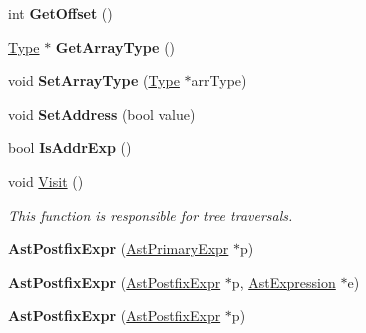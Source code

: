 \begin{DoxyCompactItemize}
\item 
\hypertarget{classAstPostfixExpr_a73527573548a64455b1ff7f7c3e3af83}{int {\bfseries Get\-Offset} ()}\label{classAstPostfixExpr_a73527573548a64455b1ff7f7c3e3af83}

\item 
\hypertarget{classAstPostfixExpr_aa57ee270d53c864251a58b33932e8b93}{\hyperlink{classType}{Type} $\ast$ {\bfseries Get\-Array\-Type} ()}\label{classAstPostfixExpr_aa57ee270d53c864251a58b33932e8b93}

\item 
\hypertarget{classAstPostfixExpr_aa5d70d77be68a21aa2f30a6c276e7453}{void {\bfseries Set\-Array\-Type} (\hyperlink{classType}{Type} $\ast$arr\-Type)}\label{classAstPostfixExpr_aa5d70d77be68a21aa2f30a6c276e7453}

\item 
\hypertarget{classAstPostfixExpr_a8999a89a30f416241a29e7f8b8b0e948}{void {\bfseries Set\-Address} (bool value)}\label{classAstPostfixExpr_a8999a89a30f416241a29e7f8b8b0e948}

\item 
\hypertarget{classAstPostfixExpr_a84889c2ddd3eabd0966e08f85a2576c4}{bool {\bfseries Is\-Addr\-Exp} ()}\label{classAstPostfixExpr_a84889c2ddd3eabd0966e08f85a2576c4}

\item 
void \hyperlink{classAstPostfixExpr_ae3e7fdbd4c2bf888ee62760e6f422cad}{Visit} ()
\begin{DoxyCompactList}\small\item\em This function is responsible for tree traversals. \end{DoxyCompactList}\item 
\hypertarget{classAstPostfixExpr_a8299517f87239b0428545cdfc96f0bbc}{{\bfseries Ast\-Postfix\-Expr} (\hyperlink{classAstPrimaryExpr}{Ast\-Primary\-Expr} $\ast$p)}\label{classAstPostfixExpr_a8299517f87239b0428545cdfc96f0bbc}

\item 
\hypertarget{classAstPostfixExpr_a5dd762cbae8160f94a661ecdf3a90770}{{\bfseries Ast\-Postfix\-Expr} (\hyperlink{classAstPostfixExpr}{Ast\-Postfix\-Expr} $\ast$p, \hyperlink{classAstExpression}{Ast\-Expression} $\ast$e)}\label{classAstPostfixExpr_a5dd762cbae8160f94a661ecdf3a90770}

\item 
\hypertarget{classAstPostfixExpr_af17b325f38a7138728773d86a9342105}{{\bfseries Ast\-Postfix\-Expr} (\hyperlink{classAstPostfixExpr}{Ast\-Postfix\-Expr} $\ast$p)}\label{classAstPostfixExpr_af17b325f38a7138728773d86a9342105}


\end{DoxyCompactItemize}
